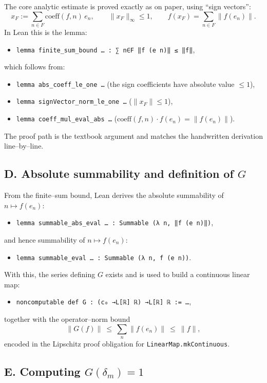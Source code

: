 \documentclass[11pt]{article}
\begin{document}
The core analytic estimate is proved exactly as on paper, using ``sign vectors'':
\[
x_F:=\sum_{n\in F}\mathrm{coeff}(f,n)\,e_n,\qquad \|x_F\|_\infty\le 1,\qquad
f(x_F)=\sum_{n\in F}\|f(e_n)\|.
\]
In Lean this is the lemma:
\begin{itemize}
\item \verb|lemma finite_sum_bound … : ∑ n∈F ‖f (e n)‖ ≤ ‖f‖|,
\end{itemize}
which follows from:
\begin{itemize}
\item \verb|lemma abs_coeff_le_one …| (the sign coefficients have absolute value $\le 1$),
\item \verb|lemma signVector_norm_le_one …| ($\|x_F\|\le 1$),
\item \verb|lemma coeff_mul_eval_abs …| ($\mathrm{coeff}(f,n)\cdot f(e_n)=\|f(e_n)\|$).
\end{itemize}
The proof path is the textbook argument and matches the handwritten derivation line--by--line.

\subsection*{D. Absolute summability and definition of $G$}

From the finite--sum bound, Lean derives the absolute summability of $n\mapsto f(e_n)$:
\begin{itemize}
\item \verb|lemma summable_abs_eval … : Summable (λ n, ‖f (e n)‖)|,
\end{itemize}
and hence summability of $n\mapsto f(e_n)$:
\begin{itemize}
\item \verb|lemma summable_eval … : Summable (λ n, f (e n))|.
\end{itemize}
With this, the series defining $G$ exists and is used to build a continuous linear map:
\begin{itemize}
\item \verb|noncomputable def G : (c₀ →L[ℝ] ℝ) →L[ℝ] ℝ := …|,
\end{itemize}
together with the operator--norm bound
\[
\|G(f)\|\ \le\ \sum_n \|f(e_n)\|\ \le\ \|f\|,
\]
encoded in the Lipschitz proof obligation for \verb|LinearMap.mkContinuous|.

\subsection*{E. Computing $G(\delta_m)=1$}
\end{document}
